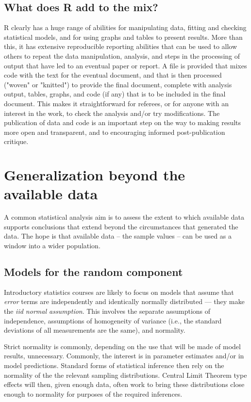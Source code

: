 \subsection{What does R add to the mix?}

R clearly has a huge range of abilities for manipulating data, fitting
and checking statistical models, and for using graphs and tables to
present results.  More than this, it has extensive reproducible
reporting abilities that can be used to allow others to repeat the
data manipulation, analysis, and steps in the processing of output
that have led to an eventual paper or report.  A file is provided
that mixes code with the text for the eventual document, and that
is then processed ("woven" or "knitted") to provide the final
document, complete with analysis output, tables, graphs, and code
(if any) that is to be included in the final document.  This makes
it straightforward for referees, or for anyone with an interest in 
the work, to check the analysis and/or try modifications.
The publication of data and code is an important step on the way
to making results more open and transparent, and to encouraging 
informed post-publication critique.


\section{Generalization beyond the available data}

A common statistical analysis aim is to assess the extent to which
available data supports conclusions that extend beyond the
circumstances that generated the data. The hope is that available
data -- the sample values -- can be used as a window into a wider
population.

\subsection{Models for the random component}

Introductory statistics
courses are likely to focus on models that assume that \textit{error}
terms are independently and identically normally distributed ---
they make the \textit{iid normal assumption}.  This involves the 
separate assumptions of independence, assumptions of homogeneity
of variance (i.e., the standard deviations of all measurements
are the same), and normality. 

Strict normality is commonly, depending
on the use that will be made of model results, unnecessary. 
Commonly, the interest is in parameter estimates and/or in model 
predictions.  Standard forms of statistical inference then rely
on the normality of the the relevant sampling distributions.
Central Limit Theorem type effects will then, given enough data, 
often work to bring these distributions close enough to normality 
for purposes of the required inferences.  

